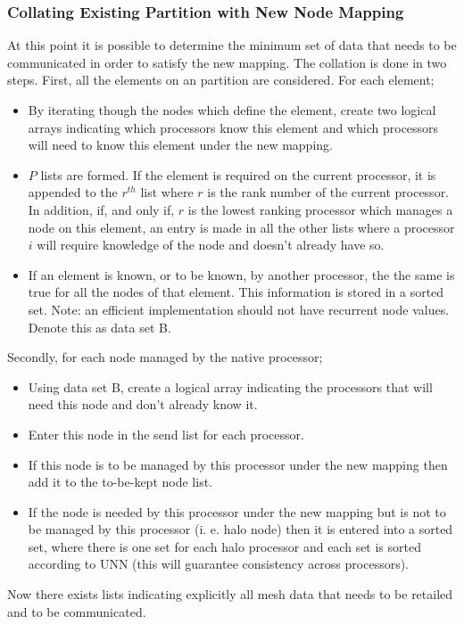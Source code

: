 \documentclass[11pt]{article}
\begin{document}
\subsubsection{Collating Existing Partition with New Node Mapping}
At this point it is possible to determine the minimum set of data that
needs to be communicated in order to satisfy the new mapping. The
collation is done in two steps. First, all the elements on an
partition are considered. For each element;
\begin{itemize}
\item By iterating though the nodes which define the element, create
two logical arrays indicating which processors know this element and
which processors will need to know this element under the new
mapping.
\item $P$ lists are formed. If the element is required on the current
processor, it is appended to the $r^{th}$ list where $r$ is the rank
number of the current processor. In addition, if, and only if, $r$ is
the lowest ranking processor which manages a node on this element, an
entry is made in all the other lists where a processor $i$ will
require knowledge of the node and doesn't already have so.
\item If an element is known, or to be known, by another processor,
the the same is true for all the nodes of that element. This
information is stored in a sorted set. Note: an efficient
implementation should not have recurrent node values. Denote this as
data set B.
\end{itemize}
Secondly, for each node managed by the native processor;
\begin{itemize}
\item Using data set B, create a logical array indicating the
processors that will need this node and don't already know it.
\item Enter this node in the send list for each processor.
\item If this node is to be managed by this processor under the new
mapping then add it to the to-be-kept node list.
\item If the node is needed by this processor under the new mapping
but is not to be managed by this processor (i. e. halo node) then it
is entered into a sorted set, where there is one set for each halo
processor and each set is sorted according to UNN (this will guarantee
consistency across processors).
\end{itemize}
Now there exists lists indicating explicitly all mesh data that needs
to be retailed and to be communicated.
\end{document}

